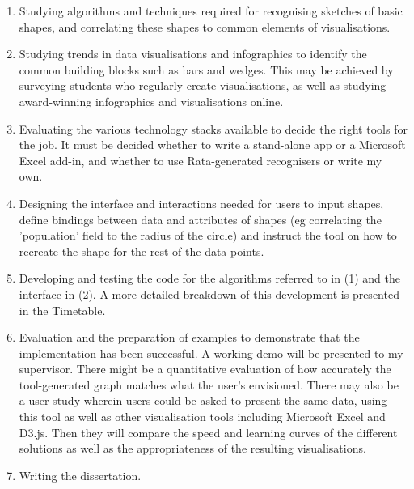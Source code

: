\begin{enumerate}

\item Studying algorithms and techniques required for recognising sketches of basic shapes, and correlating these shapes to common elements of visualisations.

\item Studying trends in data visualisations and infographics to identify the common building blocks such as bars and wedges. This may be achieved by surveying students who regularly create visualisations, as well as studying award-winning infographics and visualisations online.

\item Evaluating the various technology stacks available to decide the right tools for the job. It must be decided whether to write a stand-alone app or a Microsoft Excel add-in, and whether to use Rata-generated recognisers or write my own.

\item Designing the interface and interactions needed for users to input shapes, define bindings between data and attributes of shapes (eg correlating the 'population' field to the radius of the circle) and instruct the tool on how to recreate the shape for the rest of the data points.

\item Developing and testing the code for the algorithms
referred to in (1) and the interface in (2). A more detailed breakdown of this development is presented in the Timetable.

\item Evaluation and the preparation of examples to demonstrate that the implementation has been successful. A working demo will be presented to my supervisor. There might be a quantitative evaluation of how accurately the tool-generated graph matches what the user's envisioned. There may also be a user study wherein users could be asked to present the same data, using this tool as well as other visualisation tools including Microsoft Excel and D3.js. Then they will compare the speed and learning curves of the different solutions as well as the appropriateness of the resulting visualisations.

\item Writing the dissertation.

\end{enumerate}

\clearpage

